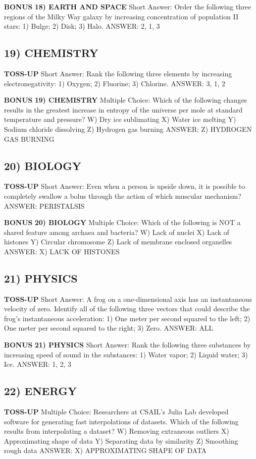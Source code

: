 \documentclass{article}
\begin{document}
\textbf{BONUS}
\textbf{18) EARTH AND SPACE}
Short Answer: Order the following three regions of the Milky Way galaxy by increasing concentration of population II stars: 1) Bulge; 2) Disk; 3) Halo.
ANSWER: 2, 1, 3

\subsection*{19) CHEMISTRY}
\textbf{TOSS-UP}
Short Answer: Rank the following three elements by increasing electronegativity: 1) Oxygen; 2) Fluorine; 3) Chlorine.
ANSWER: 3, 1, 2

\textbf{BONUS}
\textbf{19) CHEMISTRY}
Multiple Choice: Which of the following changes results in the greatest increase in entropy of the universe per mole at standard temperature and pressure?
W) Dry ice sublimating
X) Water ice melting
Y) Sodium chloride dissolving
Z) Hydrogen gas burning
ANSWER: Z) HYDROGEN GAS BURNING

\subsection*{20) BIOLOGY}
\textbf{TOSS-UP}
Short Answer: Even when a person is upside down, it is possible to completely swallow a bolus through the action of which muscular mechanism?
ANSWER: PERISTALSIS

\textbf{BONUS}
\textbf{20) BIOLOGY}
Multiple Choice: Which of the following is NOT a shared feature among archaea and bacteria?
W) Lack of nuclei
X) Lack of histones
Y) Circular chromosome
Z) Lack of membrane enclosed organelles
ANSWER: X) LACK OF HISTONES

\subsection*{21) PHYSICS}
\textbf{TOSS-UP}
Short Answer: A frog on a one-dimensional axis has an instantaneous velocity of zero. Identify all of the following three vectors that could describe the frog's instantaneous acceleration: 1) One meter per second squared to the left; 2) One meter per second squared to the right; 3) Zero.
ANSWER: ALL

\textbf{BONUS}
\textbf{21) PHYSICS}
Short Answer: Rank the following three substances by increasing speed of sound in the substances: 1) Water vapor; 2) Liquid water; 3) Ice.
ANSWER: 1, 2, 3

\subsection*{22) ENERGY}
\textbf{TOSS-UP}
Multiple Choice: Researchers at CSAIL's Julia Lab developed software for generating fast interpolations of datasets. Which of the following results from interpolating a dataset?
W) Removing extraneous outliers
X) Approximating shape of data
Y) Separating data by similarity
Z) Smoothing rough data
ANSWER: X) APPROXIMATING SHAPE OF DATA
\end{document}
